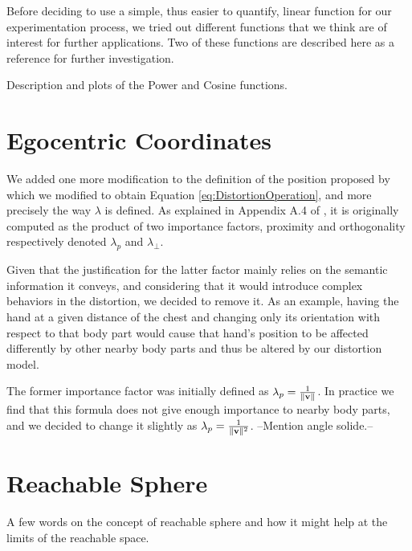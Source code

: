 Before deciding to use a simple, thus easier to quantify, linear function for our experimentation process, we tried out different functions that we think are of interest for further applications. Two of these functions are described here as a reference for further investigation.

Description and plots of the Power and Cosine functions.

\section{Egocentric Coordinates}

We added one more modification to the definition of the position proposed by \cite{molla2017egocentric} which we modified to obtain Equation \ref{eq:DistortionOperation}, and more precisely the way $\lambda $ is defined. As explained in Appendix A.4 of \cite{molla2016precise}, it is originally computed as the product of two importance factors, proximity and orthogonality respectively denoted $\lambda_p$ and $\lambda_\bot $.

Given that the justification for the latter factor mainly relies on the semantic information it conveys, and considering that it would introduce complex behaviors in the distortion, we decided to remove it. As an example, having the hand at a given distance of the chest and changing only its orientation with respect to that body part would cause that hand's position to be affected differently by other nearby body parts and thus be altered by our distortion model.

The former importance factor was initially defined as $\lambda_p = \frac{1}{\lVert\mathbf{v}\rVert}$. In practice we find that this formula does not give enough importance to nearby body parts, and we decided to change it slightly as $\lambda_p = \frac{1}{\lVert\mathbf{v}\rVert^2}$. --Mention angle solide.-- %

\section{Reachable Sphere}

A few words on the concept of reachable sphere and how it might help at the limits of the reachable space.
